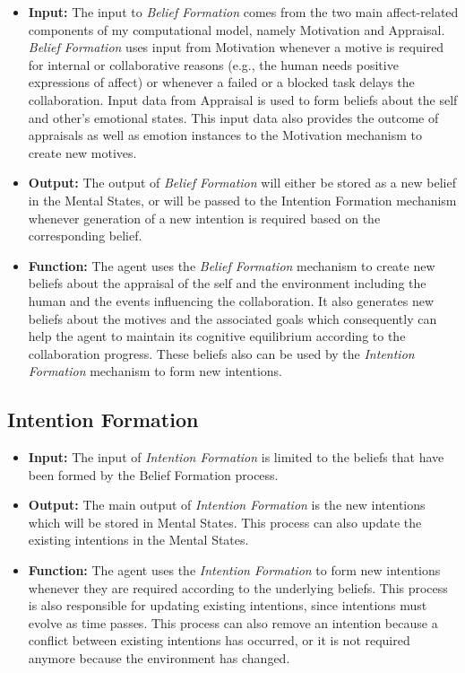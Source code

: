 \documentclass[12pt]{report}
\begin{document}
\begin{itemize}
  \item \textbf{Input:} The input to \textit{Belief Formation} comes from the
  two main affect-related components of my computational model, namely
  Motivation and Appraisal. \textit{Belief Formation} uses input from Motivation
  whenever a motive is required for internal or collaborative reasons (e.g., the
  human needs positive expressions of affect) or whenever a failed or a blocked
  task delays the collaboration. Input data from Appraisal is used to form
  beliefs about the self and other's emotional states. This input data also
  provides the outcome of appraisals as well as emotion instances to the
  Motivation mechanism to create new motives.
  
  \item \textbf{Output:} The output of \textit{Belief Formation} will either be
  stored as a new belief in the Mental States, or will be passed to the
  Intention Formation mechanism whenever generation of a new intention is
  required based on the corresponding belief.
  
  \item \textbf{Function:} The agent uses the \textit{Belief Formation} mechanism
  to create new beliefs about the appraisal of the self and the environment
  including the human and the events influencing the collaboration. It also
  generates new beliefs about the motives and the associated goals which
  consequently can help the agent to maintain its cognitive equilibrium
  according to the collaboration progress. These beliefs also can be used by the
  \textit{Intention Formation} mechanism to form new intentions.
\end{itemize}

\subsection{Intention Formation}

\begin{itemize}
  \item \textbf{Input:} The input of \textit{Intention Formation} is limited to
  the beliefs that have been formed by the Belief Formation process.
  
  \item \textbf{Output:} The main output of \textit{Intention Formation} is the
  new intentions which will be stored in Mental States. This process can also
  update the existing intentions in the Mental States.
  
  \item \textbf{Function:} The agent uses the \textit{Intention Formation} to
  form new intentions whenever they are required according to the underlying
  beliefs. This process is also responsible for updating existing intentions,
  since intentions must evolve as time passes. This process can also remove an
  intention because a conflict between existing intentions has occurred, or it
  is not required anymore because the environment has changed.
\end{itemize}
\end{document}
